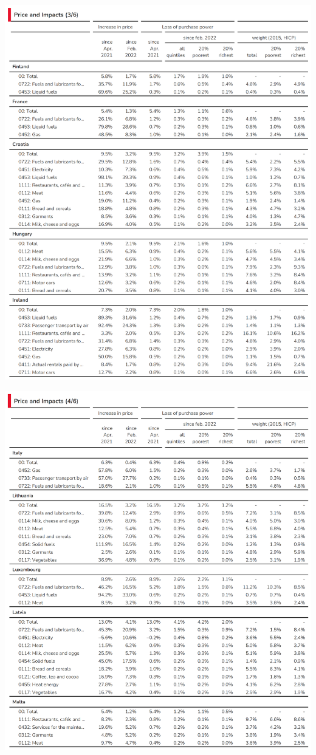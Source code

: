 \documentclass[
  9pt,
  a4paper,
  DIV=11,
  numbers=noendperiod,
  oneside]{scrartcl}
\begin{document}
\includegraphics[width=17cm,height=\textheight]{../svg/annex_3.png}

\includegraphics[width=17cm,height=\textheight]{../svg/annex_4.png}
\end{document}
